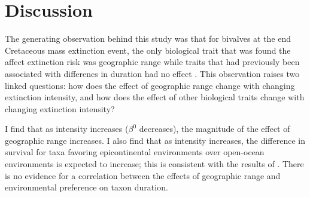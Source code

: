 \documentclass[11pt]{article}
\begin{document}
\section*{Discussion}



The generating observation behind this study was that for bivalves at the end Cretaceous mass extinction event, the only biological trait that was found the affect extinction risk was geographic range while traits that had previously been associated with differencs in duration had no effect \citep{Jablonski1986}. This observation raises two linked questions: how does the effect of geographic range change with changing extinction intensity, and how does the effect of other biological traits change with changing extinction intensity?

I find that as intensity increases (\(\beta^{0}\) decreases), the magnitude of the effect of geographic range increases. I also find that as intensity increases, the difference in survival for taxa favoring epicontinental environments over open-ocean environments is expected to increase; this is consistent with the results of \citet{Miller2009a}. There is no evidence for a correlation between the effects of geographic range and environmental preference on taxon duration. %

\end{document}
